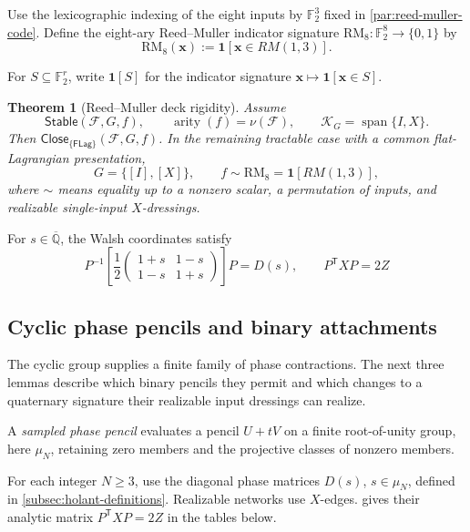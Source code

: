 \documentclass[11pt,letterpaper,onecolumn]{article}
\theoremstyle{plain}
\newtheorem{theorem}{Theorem}[section]
\theoremstyle{definition}
\theoremstyle{remark}
\newcommand{\AlgNums}{\overline{\mathbb Q}}
\newcommand{\Ftwo}{\mathbb F_2}
\newcommand{\cF}{\mathcal F}
\newcommand{\Stable}{\mathsf{Stable}}
\newcommand{\Close}{\mathsf{Close}}
\newcommand{\FLag}{\mathsf{FLag}}
\newcommand{\Span}{\operatorname{span}}
\newcommand{\arity}{\operatorname{arity}}
\newcommand{\one}{\mathbf 1}
\newcommand{\RMcore}{\mathrm{RM}_8}
\begin{document}
Use the lexicographic indexing of the eight inputs by \(\Ftwo^3\) fixed in
\cref{par:reed-muller-code}.
Define the eight-ary Reed--Muller indicator signature
\(\RMcore:\Ftwo^8\to\{0,1\}\) by
\begin{equation}
  \RMcore({\mathbf{x}}):=\one[{\mathbf{x}}\in RM(1,3)].
  \label{eq:RM-core}
\end{equation}

For \(S\subseteq\Ftwo^r\), write \(\one[S]\) for the indicator
signature \({\mathbf{x}}\mapsto\one[{\mathbf{x}}\in S]\).

\begin{theorem}[Reed--Muller deck rigidity]
\label{thm:reed-muller-rigidity}
Assume
\[
 \Stable(\cF,G,f),\qquad
 \arity(f)=\nu(\cF),\qquad
 \mathscr K_G=\Span\{I,X\}.
\]
Then \(\Close_{\{\FLag\}}(\cF,G,f)\).  In the remaining tractable case with a common flat-Lagrangian presentation,
\[
 G=\{[I],[X]\},\qquad
 f\sim\RMcore=\one[RM(1,3)],
\]
where \(\sim\) means equality up to a nonzero scalar, a permutation of
inputs, and realizable single-input \(X\)-dressings.
\end{theorem}

For \(s\in\AlgNums\), the Walsh coordinates satisfy
\begin{equation*}
  P^{-1}\!\left[\frac12
  \begin{pmatrix}1+s&1-s\\1-s&1+s\end{pmatrix}\right]P
  =D(s),
  \qquad
  P^{\mathsf T}XP=2Z
\end{equation*}




\subsection{Cyclic phase pencils and binary attachments}
\label{subsec:proper-cyclic-phase-pencils}

The cyclic group supplies a finite family of phase contractions.  The next
three lemmas describe which binary pencils they permit and which changes
to a quaternary signature their realizable input dressings can realize.

A \emph{sampled phase pencil} evaluates a pencil \(U+tV\) on a finite
root-of-unity group, here \(\mu_N\), retaining zero members and the
projective classes of nonzero members.

For each integer \(N\ge3\), use the diagonal phase matrices
\(D(s)\), \(s\in\mu_N\), defined in \cref{subsec:holant-definitions}.
Realizable networks use \(X\)-edges. 
gives their analytic matrix \(P^{\mathsf T}XP=2Z\) in the tables below.
\end{document}
